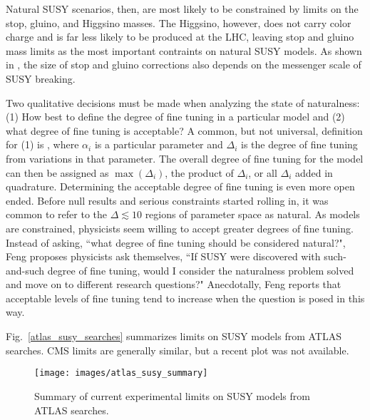 \documentclass[12pt]{article}
\begin{document}
    Natural SUSY scenarios, then, are most likely to be constrained by limits on the stop, gluino, and Higgsino masses. The Higgsino, however, does not carry color charge and is far less likely to be produced at the LHC, leaving stop and gluino mass limits as the most important contraints on natural SUSY models. As shown in , the size of stop and gluino corrections also depends on the messenger scale of SUSY breaking.  

    Two qualitative decisions must be made when analyzing the state of naturalness: (1) How best to define the degree of fine tuning in a particular model and (2) what degree of fine tuning is acceptable? A common, but not universal, definition for (1) is , where $\alpha_i$ is a particular parameter and $\Delta_i$ is the degree of fine tuning from variations in that parameter. The overall degree of fine tuning for the model can then be assigned as $\max{\left(\Delta_i\right)}$, the product of $\Delta_i$, or all $\Delta_i$ added in quadrature. Determining the acceptable degree of fine tuning is even more open ended. Before null results and serious constraints started rolling in, it was common to refer to the $\Delta \lesssim 10$ regions of parameter space as natural. As models are constrained, physicists seem willing to accept greater degrees of fine tuning. Instead of asking, ``what degree of fine tuning should be considered natural?", Feng proposes physicists ask themselves, ``If SUSY were discovered with such-and-such degree of fine tuning, would I consider the naturalness problem solved and move on to different research questions?" Anecdotally, Feng reports that acceptable levels of fine tuning tend to increase when the question is posed in this way.  

    Fig.~\ref{atlas_susy_searches} summarizes limits on SUSY models from ATLAS searches. CMS limits are generally similar, but a recent plot was not available.   

    \noindent \begin{figure}[htbp] \begin{center}
    \texttt{[image: images/atlas\_susy\_summary]}
    \caption{Summary of current experimental limits on SUSY models from ATLAS searches.}
    \label{atlas_susy_summary}
    \end{center} \end{figure}
\end{document}
